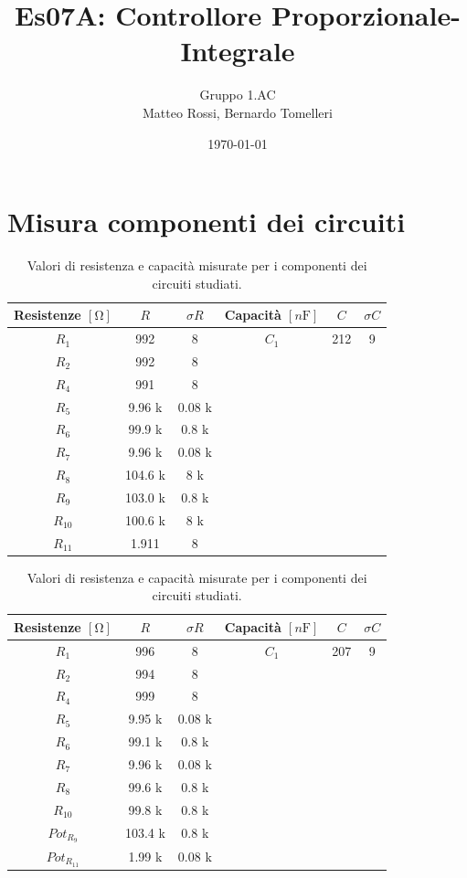 \documentclass[10pt, a4paper, italian]{article}
\author{Gruppo 1.AC \\ Matteo Rossi, Bernardo Tomelleri}
\title{Es07A: Controllore Proporzionale-Integrale}
\begin{document}
\date{\today}
\maketitle

\section{Misura componenti dei circuiti}
\begin{table}[htbp]
\centering
\begin{tabular}{cccccc}
\toprule
Resistenze $[\si{\ohm}]$ & $R$ & $\sigma R$ & Capacità $[\si{n\F}]$ & $C$ &
$\sigma C$ \\
\midrule
\midrule
$R_1$	  	& 992 	& 8		& $C_1$ & 212	& 9 \\
$R_2$	  	& 992	& 8		& & & \\
$R_4$	  	& 991	& 8		& & & \\
$R_5$	  	& 9.96 k	& 0.08	k& & & \\
$R_6$	  	& 99.9 k	& 0.8	k& & & \\
$R_7$	  	& 9.96 k& 0.08	k	& & & \\
$R_8$	  	& 104.6	k& 8		k& & & \\
$R_9$	  	& 103.0	k& 0.8	k	& & & \\
$R_{10}$  	& 100.6	k& 8		k& & & \\
$R_{11}$  	& 1.911	& 8		& & & \\
\bottomrule     
\end{tabular}
\caption{Valori di resistenza e capacità misurate per i componenti dei
circuiti studiati. \label{tab: rcmes_B}}

\begin{tabular}{cccccc}
\toprule
Resistenze $[\si{\ohm}]$ & $R$ & $\sigma R$ & Capacità $[\si{n\F}]$ & $C$ &
$\sigma C$ \\
\midrule
\midrule
$R_1$	  	& 996 	& 8		& $C_1$ & 207	& 9 \\
$R_2$	  	& 994	& 8		& & & \\
$R_4$	  	& 999	& 8		& & & \\
$R_5$	  	& 9.95	k& 0.08	k& & & \\
$R_6$	  	& 99.1	k& 0.8	k& & & \\
$R_7$	  	& 9.96	k& 0.08		k& & & \\
$R_8$	  	& 99.6	k& 0.8		k& & & \\
$R_{10}$  	& 99.8	k& 0.8		k& & & \\
$Pot_{R_9}$ & 103.4 k & 0.8 k& & & \\
$Pot_{R_{11}}$ & 1.99 k & 0.08 k& & &\\
\bottomrule   
\end{tabular}
\caption{Valori di resistenza e capacità misurate per i componenti dei
circuiti studiati. \label{tab: rcmes_M}}
\end{table}
\end{document}
